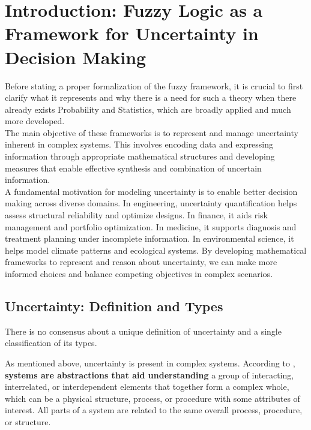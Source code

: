 \setcounter{chapter}{-1}
\chapter{Introduction: Fuzzy Logic as a Framework for Uncertainty in Decision Making}

Before stating a proper formalization of the fuzzy framework, it is crucial to first clarify what it represents and why there is a need for such a theory when there already exists Probability and Statistics, which are broadly applied and much more developed.\\

The main objective of these frameworks is to represent and manage uncertainty inherent in complex systems. This involves encoding data and expressing information through appropriate mathematical structures and developing measures that enable effective synthesis and combination of uncertain information.\\

A fundamental motivation for modeling uncertainty is to enable better decision making across diverse domains. In engineering, uncertainty quantification helps assess structural reliability and optimize designs. In finance, it aids risk management and portfolio optimization. In medicine, it supports diagnosis and treatment planning under incomplete information. In environmental science, it helps model climate patterns and ecological systems. By developing mathematical frameworks to represent and reason about uncertainty, we can make more informed choices and balance competing objectives in complex scenarios.\\

\section{Uncertainty: Definition and Types}

There is no consensus about a unique definition of uncertainty and a single classification of its types. 

As mentioned above, uncertainty is present in complex systems. According to \cite{UncertaintySciences}, \textbf{systems are abstractions that aid understanding} a group of interacting, interrelated, or interdependent elements that together form a complex whole, which can be a physical structure, process, or procedure with some attributes of interest. All parts of a system are related to the same overall process, procedure, or structure. \\

